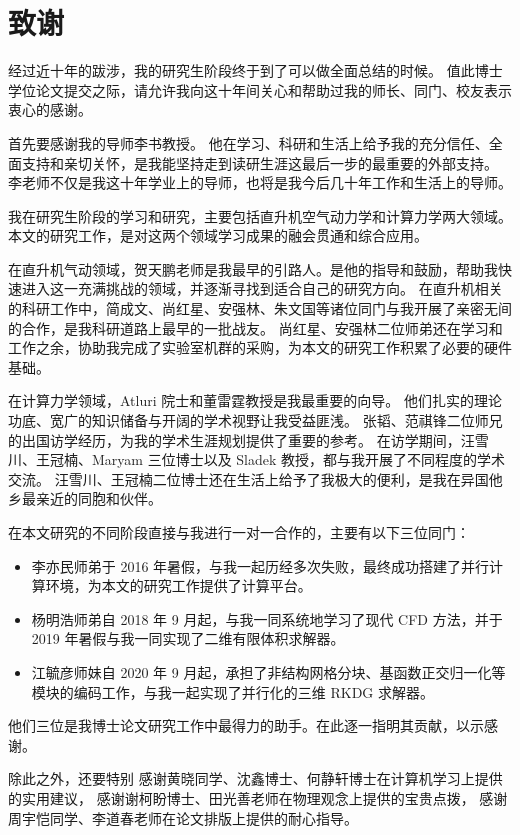 \chapter{致谢}

经过近十年的跋涉，我的研究生阶段终于到了可以做全面总结的时候。
值此博士学位论文提交之际，请允许我向这十年间关心和帮助过我的师长、同门、校友表示衷心的感谢。

首先要感谢我的导师李书教授。
他在学习、科研和生活上给予我的充分信任、全面支持和亲切关怀，是我能坚持走到读研生涯这最后一步的最重要的外部支持。
李老师不仅是我这十年学业上的导师，也将是我今后几十年工作和生活上的导师。

我在研究生阶段的学习和研究，主要包括直升机空气动力学和计算力学两大领域。
本文的研究工作，是对这两个领域学习成果的融会贯通和综合应用。

在直升机气动领域，贺天鹏老师是我最早的引路人。是他的指导和鼓励，帮助我快速进入这一充满挑战的领域，并逐渐寻找到适合自己的研究方向。
在直升机相关的科研工作中，简成文、尚红星、安强林、朱文国等诸位同门与我开展了亲密无间的合作，是我科研道路上最早的一批战友。
尚红星、安强林二位师弟还在学习和工作之余，协助我完成了实验室机群的采购，为本文的研究工作积累了必要的硬件基础。

在计算力学领域，Atluri 院士和董雷霆教授是我最重要的向导。
他们扎实的理论功底、宽广的知识储备与开阔的学术视野让我受益匪浅。
张韬、范祺锋二位师兄的出国访学经历，为我的学术生涯规划提供了重要的参考。
在访学期间，汪雪川、王冠楠、Maryam 三位博士以及 Sladek 教授，都与我开展了不同程度的学术交流。
汪雪川、王冠楠二位博士还在生活上给予了我极大的便利，是我在异国他乡最亲近的同胞和伙伴。

在本文研究的不同阶段直接与我进行一对一合作的，主要有以下三位同门：
\begin{itemize}
\item 李亦民师弟于 2016 年暑假，与我一起历经多次失败，最终成功搭建了并行计算环境，为本文的研究工作提供了计算平台。
\item 杨明浩师弟自 2018 年 9 月起，与我一同系统地学习了现代 CFD 方法，并于 2019 年暑假与我一同实现了二维有限体积求解器。
\item 江毓彦师妹自 2020 年 9 月起，承担了非结构网格分块、基函数正交归一化等模块的编码工作，与我一起实现了并行化的三维 RKDG 求解器。
\end{itemize}
他们三位是我博士论文研究工作中最得力的助手。在此逐一指明其贡献，以示感谢。

除此之外，还要特别
感谢黄晓同学、沈鑫博士、何静轩博士在计算机学习上提供的实用建议，
感谢谢柯盼博士、田光善老师在物理观念上提供的宝贵点拨，
感谢周宇恺同学、李道春老师在论文排版上提供的耐心指导。

